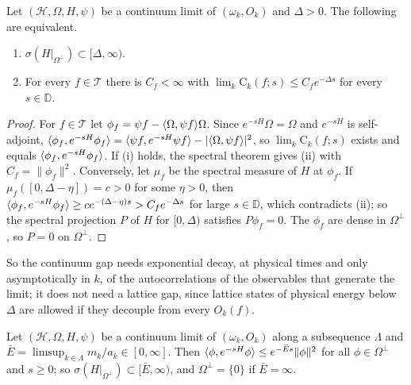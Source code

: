 \begin{proposition}\label{prop:spectralinput}
Let $(\mathcal H,\Omega,H,\psi)$ be a continuum limit of $(\omega_k,O_k)$ and
$\Delta>0$. The following are equivalent.
\begin{enumerate}[label=\textup{(\roman*)},leftmargin=*]
\item $\sigma(H|_{\Omega^\perp})\subset[\Delta,\infty)$.
\item For every $f\in\mathcal T$ there is $C_f<\infty$ with $\lim_k\mathrm C_k(
f;s)\le C_fe^{-\Delta s}$ for every $s\in\mathbb D$.
\end{enumerate}
\end{proposition}

\begin{proof}
For $f\in\mathcal T$ let $\phi_f=\psi f-\langle \Omega,\psi f\rangle\Omega$. Since $e^{-sH}
\Omega=\Omega$ and $e^{-sH}$ is self-adjoint, $\langle \phi_f,e^{-sH}\phi_f\rangle=\langle 
\psi f,e^{-sH}\psi f\rangle-|\langle \Omega,\psi f\rangle|^2$, so $\lim_k\mathrm C_k(f;s)$ exists
and equals $\langle \phi_f,e^{-sH}\phi_f\rangle$. If (i) holds, the spectral theorem
gives (ii) with $C_f=\|\phi_f\|^2$. Conversely, let $\mu_f$ be the spectral
measure of $H$ at $\phi_f$. If $\mu_f([0,\Delta-\eta])=c>0$ for some $\eta>0$,
then $\langle \phi_f,e^{-sH}\phi_f\rangle\ge ce^{-(\Delta-\eta)s}>C_fe^{-\Delta s}$ for
large $s\in\mathbb D$, which contradicts (ii); so the spectral projection $P$ of
$H$ for $[0,\Delta)$ satisfies $P\phi_f=0$. The $\phi_f$ are dense in
$\Omega^\perp$, so $P=0$ on $\Omega^\perp$.
\end{proof}

So the continuum gap needs exponential decay, at physical times and only
asymptotically in $k$, of the autocorrelations of the observables that generate
the limit; it does not need a lattice gap, since lattice states of physical
energy below $\Delta$ are allowed if they decouple from every $O_k(f)$.

\begin{lemma}\label{lem:limsupgap}
Let $(\mathcal H,\Omega,H,\psi)$ be a continuum limit of $(\omega_k,O_k)$ along
a subsequence $\Lambda$ and $\bar E=\limsup_{k\in\Lambda}m_k/a_k\in[0,\infty]$.
Then $\langle \phi,e^{-sH}\phi\rangle\le e^{-\bar Es}\|\phi\|^2$ for all $\phi\in\Omega^\perp$
and $s\ge0$; so $\sigma(H|_{\Omega^\perp})\subset[\bar E,\infty)$, and $\Omega^\perp
=\{0\}$ if $\bar E=\infty$.
\end{lemma}

